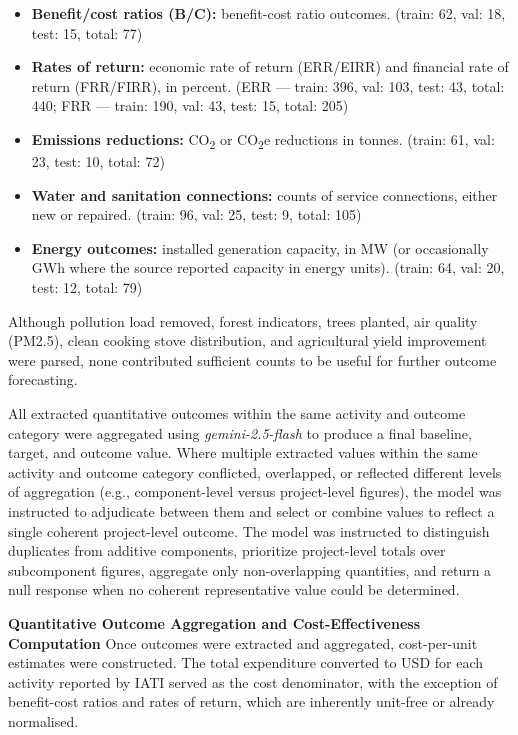 \documentclass[12pt,a4paper]{article}
\begin{document}
\begin{itemize}[noitemsep,topsep=0pt]
\item \textbf{Benefit/cost ratios (B/C):} benefit-cost ratio outcomes. (train: 62, val: 18, test: 15, total: 77)
\item \textbf{Rates of return:} economic rate of return (ERR/EIRR) and financial rate of return (FRR/FIRR), in percent. (ERR — train: 396, val: 103, test: 43, total: 440; FRR — train: 190,  val: 43, test: 15, total: 205)
\item \textbf{Emissions reductions:} CO\textsubscript{2} or CO\textsubscript{2}e reductions in tonnes. (train: 61, val: 23, test: 10, total: 72)
\item \textbf{Water and sanitation connections:} counts of service connections, either new or repaired. (train: 96, val: 25, test: 9, total: 105)
\item \textbf{Energy outcomes:} installed generation capacity, in MW (or occasionally GWh where the source reported capacity in energy units). (train: 64, val: 20, test: 12, total: 79)

\end{itemize}
Although pollution load removed, forest indicators, trees planted, air quality (PM2.5), clean cooking stove distribution, and agricultural yield improvement were parsed, none contributed sufficient counts to be useful for further outcome forecasting.

All extracted quantitative outcomes within the same activity and outcome category were aggregated using \emph{gemini-2.5-flash} to produce a final baseline, target, and outcome value. Where multiple extracted values within the same activity and outcome category conflicted, overlapped, or reflected different levels of aggregation (e.g., component-level versus project-level figures), the model was instructed to adjudicate between them and select or combine values to reflect a single coherent project-level outcome. The model was instructed to distinguish duplicates from additive components, prioritize project-level totals over subcomponent figures, aggregate only non-overlapping quantities, and return a null response when no coherent representative value could be determined.

\textbf{Quantitative Outcome Aggregation and Cost-Effectiveness Computation}
Once outcomes were extracted and aggregated, cost-per-unit estimates were constructed. The total expenditure converted to USD for each activity reported by IATI served as the cost denominator, with the exception of benefit-cost ratios and rates of return, which are inherently unit-free or already normalised.
\end{document}
